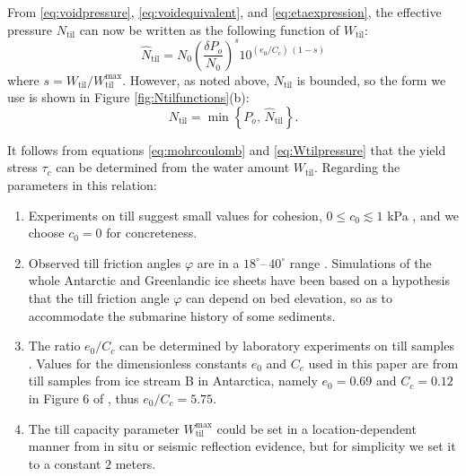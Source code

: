 \documentclass[gmd]{copernicus}   %
\newcommand{\text}{\textrm}
\newcommand{\Ntil}{N_{\text{til}}}
\newcommand{\hatNtil}{\hat N_{\text{til}}}
\newcommand{\Wtil}{W_{\text{til}}}
\newcommand{\Wtilmax}{W_{\text{til}}^{\text{max}}}
\begin{document}
From \eqref{eq:voidpressure}, \eqref{eq:voidequivalent}, and \eqref{eq:etaexpression}, the effective pressure $\Ntil$ can now be written as the following function of $\Wtil$:
\begin{equation}
\hatNtil = N_0 \left(\frac{\delta P_o}{N_0}\right)^s 10^{(e_0/C_c)\,(1-s)}
\label{eq:NtilofWtil}
\end{equation}
where $s = \Wtil/\Wtilmax$.  However, as noted above, $\Ntil$ is bounded, so the form we use is shown in Figure \ref{fig:Ntilfunctions}(b):
\begin{equation}
\Ntil = \min\left\{P_o,\, \hatNtil\right\}.
\label{eq:Wtilpressure}
\end{equation}

It follows from equations \eqref{eq:mohrcoulomb} and \eqref{eq:Wtilpressure} that the yield stress $\tau_c$ can be determined from the water amount $\Wtil$.  Regarding the parameters in this relation:
\renewcommand{\labelenumi}{(\emph{\roman{enumi}})}
\begin{enumerate}
\item Experiments on till suggest small values for cohesion, $0 \le c_0 \lesssim 1$ kPa \citep{Tulaczyketal2000}, and we choose $c_0=0$ for concreteness.
\item Observed till friction angles $\varphi$ are in a $18^\circ$--\,$40^\circ$ range \citep{CuffeyPaterson}.  Simulations of the whole Antarctic \citep{Martinetal2011} and Greenlandic \citep{AschwandenAdalgeirsdottirKhroulev} ice sheets have been based on a hypothesis that the till friction angle $\varphi$ can depend on bed elevation, so as to accommodate the submarine history of some sediments.
\item The ratio $e_0/C_c$ can be determined by laboratory experiments on till samples \citep[e.g.][]{Hookeetal1997,Tulaczyketal2000}.  Values for the dimensionless constants $e_0$ and $C_c$ used in this paper are from till samples from ice stream B in Antarctica, namely $e_0=0.69$ and $C_c=0.12$ in Figure 6 of \cite{Tulaczyketal2000}, thus $e_0/C_c=5.75$.
\item The till capacity parameter $\Wtilmax$ could be set in a location-dependent manner from in situ \citep{Tulaczyketal2000} or seismic reflection \citep{Rooneyetal1987} evidence, but for simplicity we set it to a constant $2$ meters.
\end{enumerate}
\end{document}
